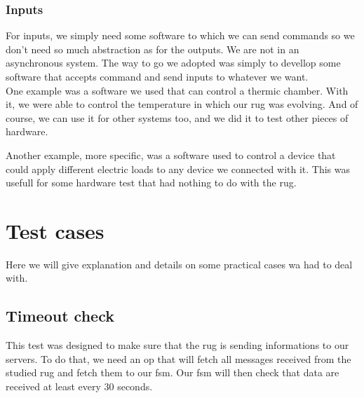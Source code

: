 \documentclass[12pt]{article}
\begin{document}
\subsubsection{Inputs}

For inputs, we simply need some software to which we can send commands so we don't need so much abstraction as for the outputs. We are not in an asynchronous system. The way to go we adopted was simply to devellop some software that accepts command and send inputs to whatever we want.\\

One example was a software we used that can control a thermic chamber. With it, we were able to control the temperature in which our \gls{rug} was evolving. And of course, we can use it for other systems too, and we did it to test other pieces of hardware.

Another example, more specific, was a software used to control a device that could apply different electric loads to any device we connected with it. This was usefull for some hardware test that had nothing to do with the \gls{rug}.



\clearpage
\section{Test cases}

Here we will give explanation and details on some practical cases wa had to deal with.

\subsection{Timeout check}

This test was designed to make sure that the \gls{rug} is sending informations to our servers. To do that, we need an \gls{op} that will fetch all messages received from the studied \gls{rug} and fetch them to our \gls{fsm}. Our \gls{fsm} will then check that data are received at least every 30 seconds.\\
\end{document}
